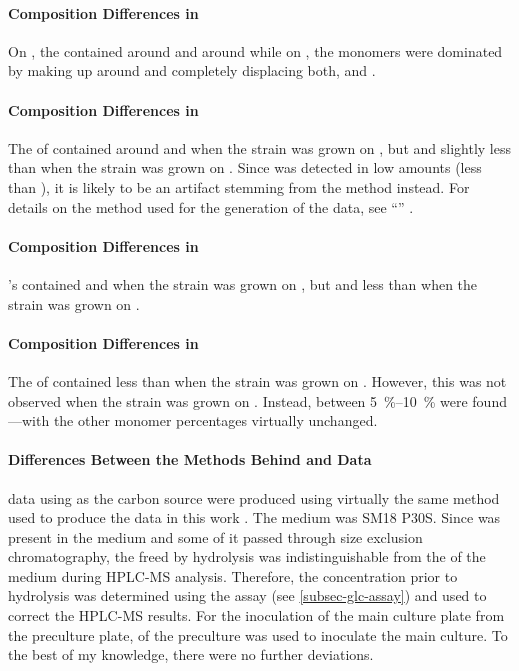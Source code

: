 \paragraph{\EPS{} Composition Differences in }
On \xyl{}, the  \eps{} contained around  \man{} and around  \glcua{} while on \glc{}, the monomers were dominated by \glc{} making up around  and completely displacing both, \man{} and \glcua{}.

\paragraph{\EPS{} Composition Differences in }
The \eps{} of  contained around  \gal{} and  \rha{} when the strain was grown on \xyl{}, but  \gal{} and slightly less than  \rha{} when the strain was grown on \glc{}. Since \glc{} was detected in low amounts (less than ), it is likely to be an artifact stemming from the method instead. For details on the method used for the generation of the \glc{} data, see \enquote{} .

\paragraph{\EPS{} Composition Differences in }
's \eps{} contained  \rha{} and  \glcua{} when the strain was grown on \xyl{}, but  \rha{} and less than  \glcua{} when the strain was grown on \glc{}.

\paragraph{\EPS{} Composition Differences in }
The \eps{} of  contained less than  \man{} when the strain was grown on \xyl{}. However, this was not observed when the strain was grown on \glc{}. Instead, between \SIrange{5}{10}{\percent} \glcua{} were found---with the other monomer percentages virtually unchanged.

\paragraph{Differences Between the Methods Behind \XYL{} and \GLC{} Data\label{par-method-diff-xyl-glc}}
\Amc{} data using \glc{} as the carbon source were produced using virtually the same method used to produce the \xyl{} data in this work \cite{Ruehmann2015b}. The medium was SM18 P30S. Since \glc{} was present in the medium and some of it passed through size exclusion chromatography, the \glc{} freed by hydrolysis was indistinguishable from the \glc{} of the medium during HPLC-MS analysis. Therefore, the \glc{} concentration prior to hydrolysis was determined using the \glc{} assay (see \vref{subsec-glc-assay}) and used to correct the HPLC-MS results. For the inoculation of the main culture plate from the preculture plate,  of the preculture was used to inoculate the main culture. To the best of my knowledge, there were no further deviations.

